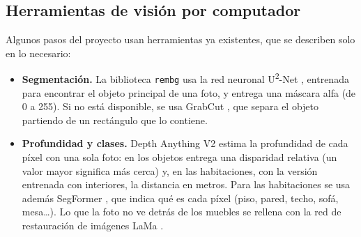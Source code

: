 \subsection{Herramientas de visión por computador}

Algunos pasos del proyecto usan herramientas ya existentes, que se describen solo
en lo necesario:
\begin{itemize}
  \item \textbf{Segmentación.} La biblioteca \texttt{rembg} usa la red neuronal
        U\textsuperscript{2}-Net \citep{qin2020}, entrenada para encontrar el
        objeto principal de una foto, y entrega una máscara alfa (de 0 a 255).
        Si no está disponible, se usa GrabCut \citep{rother2004}, que separa
        el objeto partiendo de un rectángulo que lo contiene.
  \item \textbf{Profundidad y clases.} Depth Anything V2 \citep{yang2024}
        estima la profundidad de cada píxel con una sola foto: en los objetos
        entrega una disparidad relativa (un valor mayor significa más cerca) y,
        en las habitaciones, con la versión entrenada con interiores, la
        distancia en metros. Para las habitaciones se usa además SegFormer
        \citep{xie2021}, que indica qué es cada píxel (piso, pared, techo,
        sofá, mesa\ldots). Lo que la foto no ve detrás de los muebles se
        rellena con la red de restauración de imágenes LaMa \citep{suvorov2022}.
\end{itemize}


